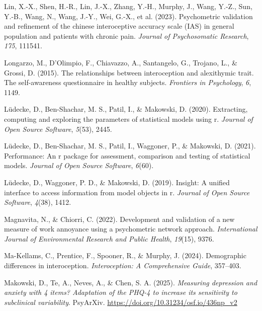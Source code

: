 \documentclass[
  man,
  floatsintext,
  longtable,
  nolmodern,
  notxfonts,
  notimes,
  mask,
  colorlinks=true,linkcolor=blue,citecolor=blue,urlcolor=blue]{apa7}
\newlength{\cslhangindent}
\newenvironment{CSLReferences}[2] %
 {\begin{list}{}{%
  \setlength{\itemindent}{0pt}
  \setlength{\leftmargin}{0pt}
  \setlength{\parsep}{0pt}
  \ifodd #1
   \setlength{\leftmargin}{\cslhangindent}
   \setlength{\itemindent}{-1\cslhangindent}
  \fi
  \setlength{\itemsep}{#2\baselineskip}}}
 {\end{list}}
\begin{document}
\begin{CSLReferences}{1}{0}
Lin, X.-X., Shen, H.-R., Lin, J.-X., Zhang, Y.-H., Murphy, J., Wang,
Y.-Z., Sun, Y.-B., Wang, N., Wang, J.-Y., Wei, G.-X., et al. (2023).
Psychometric validation and refinement of the chinese interoceptive
accuracy scale (IAS) in general population and patients with chronic
pain. \emph{Journal of Psychosomatic Research}, \emph{175}, 111541.

Longarzo, M., D'Olimpio, F., Chiavazzo, A., Santangelo, G., Trojano, L.,
\& Grossi, D. (2015). The relationships between interoception and
alexithymic trait. The self-awareness questionnaire in healthy subjects.
\emph{Frontiers in Psychology}, \emph{6}, 1149.

Lüdecke, D., Ben-Shachar, M. S., Patil, I., \& Makowski, D. (2020).
Extracting, computing and exploring the parameters of statistical models
using r. \emph{Journal of Open Source Software}, \emph{5}(53), 2445.

Lüdecke, D., Ben-Shachar, M. S., Patil, I., Waggoner, P., \& Makowski,
D. (2021). Performance: An r package for assessment, comparison and
testing of statistical models. \emph{Journal of Open Source Software},
\emph{6}(60).

Lüdecke, D., Waggoner, P. D., \& Makowski, D. (2019). Insight: A unified
interface to access information from model objects in r. \emph{Journal
of Open Source Software}, \emph{4}(38), 1412.

Magnavita, N., \& Chiorri, C. (2022). Development and validation of a
new measure of work annoyance using a psychometric network approach.
\emph{International Journal of Environmental Research and Public
Health}, \emph{19}(15), 9376.

Ma-Kellams, C., Prentice, F., Spooner, R., \& Murphy, J. (2024).
Demographic differences in interoception. \emph{Interoception: A
Comprehensive Guide}, 357--403.

Makowski, D., Te, A., Neves, A., \& Chen, S. A. (2025). \emph{Measuring
depression and anxiety with 4 items? Adaptation of the PHQ-4 to increase
its sensitivity to subclinical variability}. PsyArXiv.
\url{https://doi.org/10.31234/osf.io/436np_v2}


\end{CSLReferences}
\end{document}
